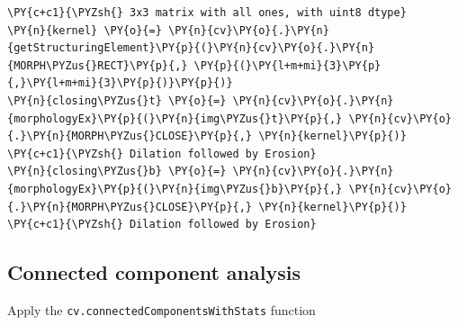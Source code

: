 \documentclass[a4paper,11pt]{article}%
\begin{document}
    \begin{tcolorbox}[breakable, size=fbox, boxrule=1pt, pad at break*=1mm,colback=cellbackground, colframe=cellborder]
\begin{Verbatim}[commandchars=\\\{\}]
\PY{c+c1}{\PYZsh{} 3x3 matrix with all ones, with uint8 dtype}
\PY{n}{kernel} \PY{o}{=} \PY{n}{cv}\PY{o}{.}\PY{n}{getStructuringElement}\PY{p}{(}\PY{n}{cv}\PY{o}{.}\PY{n}{MORPH\PYZus{}RECT}\PY{p}{,} \PY{p}{(}\PY{l+m+mi}{3}\PY{p}{,}\PY{l+m+mi}{3}\PY{p}{)}\PY{p}{)}
\PY{n}{closing\PYZus{}t} \PY{o}{=} \PY{n}{cv}\PY{o}{.}\PY{n}{morphologyEx}\PY{p}{(}\PY{n}{img\PYZus{}t}\PY{p}{,} \PY{n}{cv}\PY{o}{.}\PY{n}{MORPH\PYZus{}CLOSE}\PY{p}{,} \PY{n}{kernel}\PY{p}{)} \PY{c+c1}{\PYZsh{} Dilation followed by Erosion}
\PY{n}{closing\PYZus{}b} \PY{o}{=} \PY{n}{cv}\PY{o}{.}\PY{n}{morphologyEx}\PY{p}{(}\PY{n}{img\PYZus{}b}\PY{p}{,} \PY{n}{cv}\PY{o}{.}\PY{n}{MORPH\PYZus{}CLOSE}\PY{p}{,} \PY{n}{kernel}\PY{p}{)} \PY{c+c1}{\PYZsh{} Dilation followed by Erosion}
\end{Verbatim}
\end{tcolorbox}

    \hypertarget{connected-component-analysis}{%
\subsection{Connected component
analysis}\label{connected-component-analysis}}

Apply the \texttt{cv.connectedComponentsWithStats} function
\end{document}
